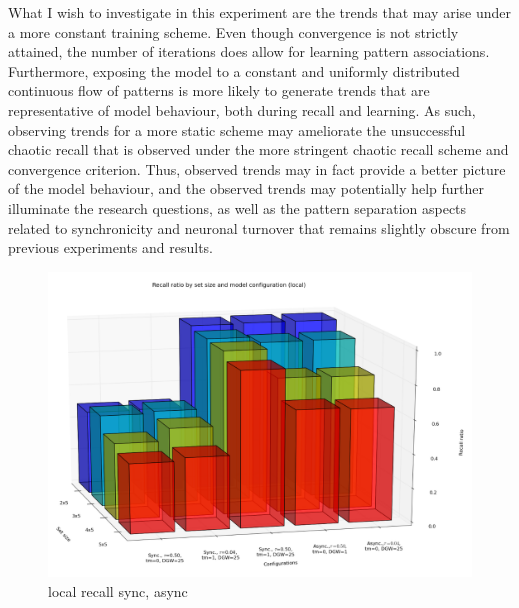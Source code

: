 What I wish to investigate in this experiment are the trends that may arise under a more constant training scheme. Even though convergence is not strictly attained, the number of iterations does allow for learning pattern associations. Furthermore, exposing the model to a constant and uniformly distributed continuous flow of patterns is more likely to generate trends that are representative of model behaviour, both during recall and learning. As such, observing trends for a more static scheme may ameliorate the unsuccessful chaotic recall that is observed under the more stringent chaotic recall scheme and convergence criterion. Thus, observed trends may in fact provide a better picture of the model behaviour, and the observed trends may potentially help further illuminate the research questions, as well as the pattern separation aspects related to synchronicity and neuronal turnover that remains slightly obscure from previous experiments and results.


\begin{figure}
    \centering
    \includegraphics[width=13cm]{fig/i-iters/local-recall}
    \caption{local recall sync, async}
    \label{fig:local-recall}
\end{figure}

